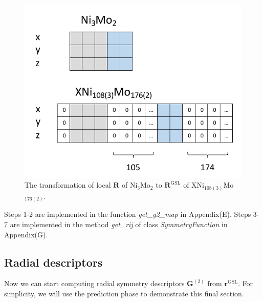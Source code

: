 \documentclass[final,1p,times]{elsarticle}
\begin{document}
% 
%
\begin{figure}[h!]
\centering
\includegraphics[scale=0.8]{figures/Fig3si.pdf}
\caption{\label{fig:Fig3si} The transformation of local $\mathbf{R}$ of 
Ni$_3$Mo$_2$ to $\mathbf{R}^{\mathrm{GSL}}$ of XNi$_{108(3)}$Mo$_{176(2)}$.
}
\end{figure}

Steps 1-2 are implemented in the function \textit{get\_g2\_map} in Appendix(E).
Steps 3-7 are implemented in the method \textit{get\_rij} of class 
\textit{SymmetryFunction} in Appendix(G). 

% 
%
\subsection{Radial descriptors}
\label{section:radial_descriptors}

Now we can start computing radial symmetry descriptors 
$\mathbf{G}^{(2)}$ from $\mathbf{r}^{\mathrm{GSL}}$. For simplicity, we will use 
the prediction phase to demonstrate this final section. 
\end{document}
